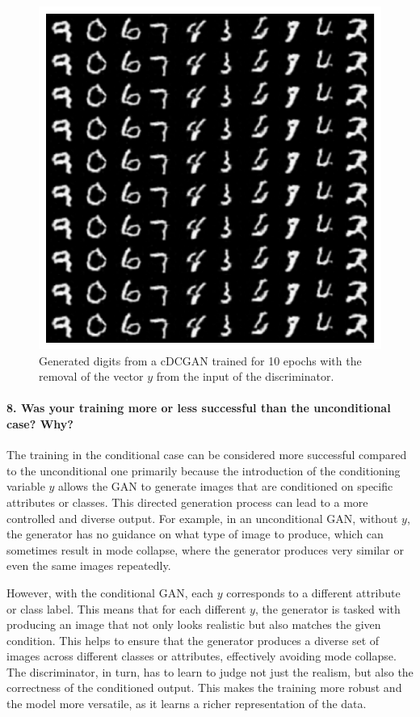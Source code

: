 \begin{figure}[H]
    \centering
    \includegraphics[width=.5\textwidth]{cgan_mnist}
    \caption{Generated digits from a cDCGAN trained for 10 epochs with the removal of the vector $y$ from the input of the discriminator.}
    \label{fig:cgan_mnist}
\end{figure}

\paragraph*{8. Was your training more or less successful than the unconditional case? Why?}

The training in the conditional case can be considered more successful compared to the unconditional one primarily because the introduction of the conditioning variable $ y $ allows the GAN to generate images that are conditioned on specific attributes or classes. This directed generation process can lead to a more controlled and diverse output. For example, in an unconditional GAN, without $ y $, the generator has no guidance on what type of image to produce, which can sometimes result in mode collapse, where the generator produces very similar or even the same images repeatedly.

However, with the conditional GAN, each $ y $ corresponds to a different attribute or class label. This means that for each different $ y $, the generator is tasked with producing an image that not only looks realistic but also matches the given condition. This helps to ensure that the generator produces a diverse set of images across different classes or attributes, effectively avoiding mode collapse. The discriminator, in turn, has to learn to judge not just the realism, but also the correctness of the conditioned output. This makes the training more robust and the model more versatile, as it learns a richer representation of the data.

